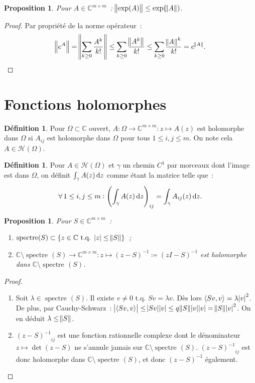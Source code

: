 \documentclass{report}
\DeclareMathOperator{\spectreOperator}{spectre\!}
\newcommand{\C}{{\mathbb C}}
\newcommand{\scpr}[2]{\left\langle#1, #2\right\rangle}
\newcommand{\tq}{\text{ t.q. }}
\newcommand{\st}{\tq}
\newcommand{\spectre}[1]{{\spectreOperator\left(#1\right)}}
\newtheorem{prp}[thm]{Proposition}
\theoremstyle{definition}
\newtheorem{déf}[thm]{Définition}
\theoremstyle{remark}
\begin{document}
\begin{prp} Pour $A \in \C^{m \times m}$~: $\norm {\exp(A)} \leq \exp(\norm A)$.
\end{prp}

\begin{proof} Par propriété de la norme opérateur~:
\[\norm {e^A} = \norm {\sum_{k \geq 0}\frac {A^k}{k!}} \leq \sum_{k \geq 0}\frac {\norm {A^k}}{k!} \leq \sum_{k \geq 0}\frac {\norm A^k}{k!} = e^{\norm A}.\]
\end{proof}

\section{Fonctions holomorphes}
\begin{déf} Pour $\Omega \subset \C$ ouvert, $A : \Omega \to \C^{m \times m} : z \mapsto A(z)$ est holomorphe dans $\Omega$ si $A_{ij}$ est holomorphe dans $\Omega$
pour tous $1 \leq i, j \leq m$. On note cela $A \in \mathscr H(\Omega)$.
\end{déf}

\begin{déf} Pour $A \in \mathscr H(\Omega)$ et $\gamma$ un chemin $C^1$ par morceaux dont l'image est dans $\Omega$, on définit $\int_\gamma A(z)\dif z$
comme étant la matrice telle que~:
\[\forall\, 1 \leq i, j \leq m : \left(\int_\gamma A(z)\dif z\right)_{ij} = \int_\gamma A_{ij}(z)\dif z.\]
\end{déf}

\begin{prp} Pour $S \in \C^{m \times m}$~:
\begin{enumerate}
	\item $\spectre S \subset \{z \in \C \st \abs z \leq \norm S\}$~;
	\item $\C \setminus \spectre S \to \C^{m \times m} : z \mapsto (z-S)^{-1} \coloneqq (zI - S)^{-1}$ est holomorphe dans $\C \setminus \spectre S$.
\end{enumerate}
\end{prp}

\begin{proof}~
\begin{enumerate}
	\item Soit $\lambda \in \spectre S$. Il existe $v \neq 0 \st Sv = \lambda v$. Dès lors $\scpr {Sv}v = \lambda\abs v^2$. De plus, par Cauchy-Schwarz~:
	$\abs {\scpr {Sv}v} \leq \abs {Sv}\abs v \le q\norm S\abs v\abs v = \norm S\abs v^2$. On en déduit $\lambda \leq \norm S$.
	\item ${(z-S)^{-1}}_{ij}$ est une fonction rationnelle complexe dont le dénominateur $z \mapsto \det(z-S)$ ne s'annule jamais sur $\C \setminus \spectre S$.
	${(z-S)^{-1}}_{ij}$ est donc holomorphe dans $\C \setminus \spectre S$, et donc $(z-S)^{-1}$ également.
\end{enumerate}
\end{proof}
\end{document}

